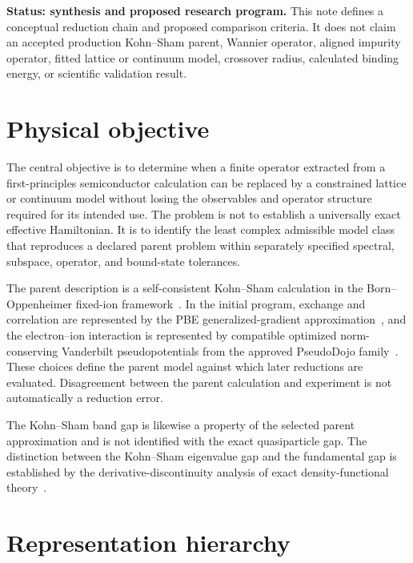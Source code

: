 
\textbf{Status: synthesis and proposed research program.} This note defines a
conceptual reduction chain and proposed comparison criteria. It does not claim
an accepted production Kohn--Sham parent, Wannier operator, aligned impurity
operator, fitted lattice or continuum model, crossover radius, calculated
binding energy, or scientific validation result.

\section*{Physical objective}

The central objective is to determine when a finite operator extracted from a
first-principles semiconductor calculation can be replaced by a constrained
lattice or continuum model without losing the observables and operator
structure required for its intended use. The problem is not to establish a
universally exact effective Hamiltonian. It is to identify the least complex
admissible model class that reproduces a declared parent problem within
separately specified spectral, subspace, operator, and bound-state tolerances.

The parent description is a self-consistent Kohn--Sham calculation in the
Born--Oppenheimer fixed-ion framework~\cite{hohenberg1964,kohn1965}. In the
initial program, exchange and correlation are represented by the PBE
generalized-gradient approximation~\cite{perdew1996}, and the electron--ion
interaction is represented by compatible optimized norm-conserving Vanderbilt
pseudopotentials from the approved PseudoDojo family~\cite{hamann2013,vansetten2018}.
These choices define the
parent model against which later reductions are evaluated. Disagreement between
the parent calculation and experiment is not automatically a reduction error.

The Kohn--Sham band gap is likewise a property of the selected parent
approximation and is not identified with the exact quasiparticle gap. The
distinction between the Kohn--Sham eigenvalue gap and the fundamental gap is
established by the derivative-discontinuity analysis of exact
density-functional theory~\cite{perdewLevy1983,shamSchluter1983}.

\section*{Representation hierarchy}

